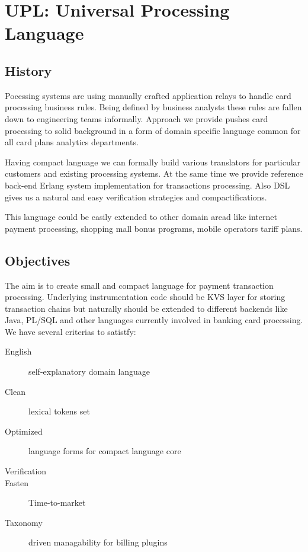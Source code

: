 \section{UPL: Universal Processing Language}

\subsection{History}

Pocessing systems are using manually crafted application
relays to handle card processing business rules. Being defined by business
analysts these rules are fallen down to engineering teams informally.
Approach we provide pushes card processing to solid background in a form
of domain specific language common for all card plans analytics departments.

Having compact language we can formally build various translators
for particular customers and existing processing systems. At the same time
we provide reference back-end Erlang system implementation
for transactions processing. Also DSL gives us a natural and easy
verification strategies and compactifications.

This language could be easily extended to other domain aread like
internet payment processing, shopping mall bonus programs, mobile
operators tariff plans.

\subsection{Objectives}

The aim is to create small and compact language for payment
transaction processing. Underlying instrumentation
code should be KVS layer for storing transaction chains but
naturally should be extended to different backends like Java,
PL/SQL and other languages currently involved in banking card processing.
We have several criterias to satistfy:

\begin{description}
  \item[English] self-explanatory domain language
  \item[Clean] lexical tokens set
  \item[Optimized] language forms for compact language core
  \item[Verification]
  \item[Fasten] Time-to-market
  \item[Taxonomy] driven managability for billing plugins
\end{description}

